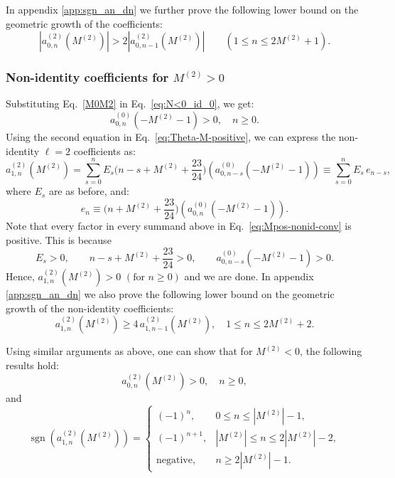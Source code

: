 \documentclass[11pt]{article}
\newcommand\be{\begin{equation}}
\newcommand\ee{\end{equation}}
\begin{document}
In appendix \ref{app:sgn_an_dn} we further prove the following lower bound on the geometric growth of the coefficients:
\begin{equation}
        \left|a^{(2)}_{0,n}(M^{(2)})\right|
        >
        2\left|a^{(2)}_{0,n-1}(M^{(2)})\right|
        \qquad(1\le n\le2M^{(2)}+1).
\label{eq:Mpos-id-supergrowth}
\end{equation}

\subsubsection{Non-identity coefficients for \(M^{(2)}>0\)}

Substituting Eq.~\eqref{M0M2} in Eq.~\eqref{eq:N<0_id_0}, we get:
\be 
        a^{(0)}_{0,n}(-M^{(2)}-1)>0,
        \quad  n\ge0.
\ee
Using the second equation in Eq.~\eqref{eq:Theta-M-positive}, we can express the non-identity $\ell=2$ coefficients as:
\begin{equation}
        a^{(2)}_{1,n}(M^{(2)}) = \sum_{s=0}^n E_s \bigg(n-s+M^{(2)}+\frac{23}{24}\bigg)\left(a^{(0)}_{0,n-s}(-M^{(2)}-1)\right)
        \equiv
        \sum_{s=0}^{n}
        E_s\, e_{n-s},
\label{eq:Mpos-nonid-conv}
\end{equation}
where $E_s$ are as before, and:
\be\label{eq:defn_el}
    e_n\equiv \bigg(n+M^{(2)}+\frac{23}{24}\bigg)\left(a^{(0)}_{0,n}(-M^{(2)}-1)\right).
\ee
Note that every factor in every summand above in Eq.~\eqref{eq:Mpos-nonid-conv} is positive. This is because
\be
        E_s>0,\qquad
        n-s+M^{(2)}+\frac{23}{24}>0,\qquad
        a^{(0)}_{0,n-s}(-M^{(2)}-1)>0.
\ee
Hence, $a^{(2)}_{1,n}(M^{(2)})>0 \,\,(\text{for }n\ge0)$ and we are done. In appendix \ref{app:sgn_an_dn} we also prove the following lower bound on the geometric growth of the non-identity coefficients:
\be\label{eq:Mpos-nonid-supergrowth}
        a^{(2)}_{1,n}(M^{(2)})
        \ge
        4\,a^{(2)}_{1,n-1}(M^{(2)}),
        \quad 1\le n\le2M^{(2)}+2.
\ee

Using similar arguments as above, one can show that for $M^{(2)}<0$, the following results hold:
\be
        a^{(2)}_{0,n}(M^{(2)})>0,
        \quad n\ge0,
\ee
and
\be\label{eq:Mpos-id-sign-final_neg}
\operatorname{sgn}\left(a^{(2)}_{1,n}(M^{(2)})\right)
=
\begin{cases}
(-1)^n, & 0\le n\le |M^{(2)}|-1,\\
(-1)^{n+1}, & |M^{(2)}|\le n\le2|M^{(2)}|-2,\\
\text{negative}, & n\ge2|M^{(2)}|-1.
\end{cases}
\ee
\end{document}
